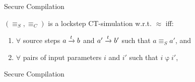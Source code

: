 \begin{frame}{Secure Compilation}
\begin{definition}
    $(\equiv_S, \equiv_C)$ is a lockstep CT-simulation w.r.t.
    $\approx$ iff:
    \begin{enumerate}
        \item<only@2-> $\forall$ source steps
        $a \To{t} b$ and $a' \To{t} b'$ such that
        $a \equiv_S a'$, and
            
        \item<only@5-> $\forall$ pairs of input parameters
        $i$ and $i'$ such that $i \mathbin{\varphi} i'$,
    \end{enumerate}
\end{definition}
\end{frame}

\begin{frame}{Secure Compilation}

\end{frame}

